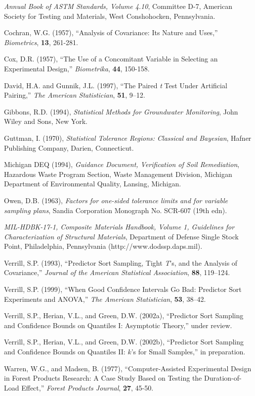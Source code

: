 \documentclass{asaproc}
\begin{document}
\begin{references}
{\footnotesize
\itemsep=3pt

\item {\em Annual Book of ASTM Standards, Volume 4.10}, Committee D-7,
American Society for Testing and Materials, West Conshohocken, Pennsylvania.
\item Cochran, W.G. (1957),  ``Analysis of Covariance: Its Nature and Uses,''
{\em Biometrics}, {\bf 13}, 261-281.
\item Cox, D.R. (1957),  ``The Use of a Concomitant Variable in Selecting an
Experimental Design,''  {\em Biometrika}, {\bf 44}, 150-158.
\item David, H.A. and Gunnik, J.L. (1997), ``The Paired {\em t} Test
Under Artificial Pairing,'' {\em The American Statistician}, {\bf 51},
9--12.
\item Gibbons, R.D. (1994), {\em Statistical Methods for Groundwater
Monitoring},
John Wiley and Sons, New York.
\item Guttman, I. (1970), {\em Statistical Tolerance Regions:
Classical and Bayesian}, Hafner Publishing Company, Darien,
Connecticut.
\item Michigan DEQ (1994), {\em Guidance Document, Verification of
Soil Remediation}, Hazardous Waste Program Section, Waste Management
Division, Michigan Department of Environmental Quality, Lansing, Michigan.
\item Owen, D.B. (1963), {\em Factors for one-sided tolerance limits
and for variable sampling plans}, Sandia Corporation Monograph No.
SCR-607 (19th edn).
\item {\em MIL-HDBK-17-1, Composite Materials Handbook, Volume 1,
Guidelines for Characterization of Structural Materials}, Department
of Defense Single Stock Point, Philadelphia, Pennsylvania
(http://www.dodssp.daps.mil).
\item Verrill, S.P. (1993),  ``Predictor Sort Sampling, Tight
{\em T}'s, and the Analysis of Covariance,'' {\em Journal of the American
Statistical Association}, {\bf 88}, 119--124.
\item Verrill, S.P. (1999),  ``When Good Confidence Intervals Go Bad:
Predictor Sort Experiments and ANOVA,'' {\em The American
Statistician}, {\bf 53}, 38--42.
\item Verrill, S.P., Herian, V.L., and Green, D.W. (2002a), ``Predictor
Sort Sampling and Confidence Bounds on Quantiles I: Asymptotic Theory,''
under review.
\item Verrill, S.P., Herian, V.L., and Green, D.W. (2002b), ``Predictor
Sort Sampling and Confidence Bounds on Quantiles II: $k$'s for Small
Samples,'' in preparation.
\item Warren, W.G., and Madsen, B. (1977),  ``Computer-Assisted Experimental Design
in Forest Products Research: A Case Study Based on Testing the 
Duration-of-Load Effect,''  {\em Forest Products Journal}, {\bf 27}, 45-50.

}
\end{references}
\end{document}
